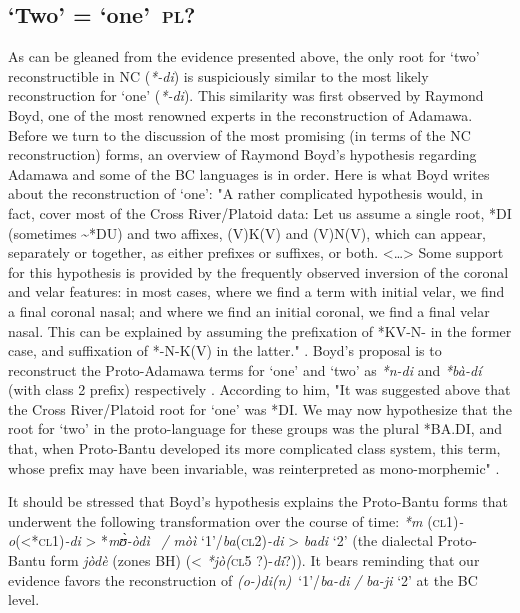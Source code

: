 \subsection{ ‘Two’ = ‘one’~\textsc{pl}?}%
As can be gleaned from the evidence presented above, the only root for ‘two’ reconstructible in NC (\textit{*-di}) is suspiciously similar to the most likely reconstruction for ‘one’ (\textit{*-di}). This similarity was first observed by Raymond Boyd, one of the most renowned experts in the reconstruction of Adamawa. Before we turn to the discussion of the most promising (in terms of the NC reconstruction) forms, an overview of Raymond Boyd’s hypothesis regarding Adamawa and some of the BC languages is in order. Here is what Boyd writes about the reconstruction of ‘one’: "A rather complicated hypothesis would, in fact, cover most of the Cross River/Platoid data: Let us assume a single root, *DI (sometimes {\textasciitilde}*DU) and two affixes, (V)K(V) and (V)N(V), which can appear, separately or together, as either prefixes or suffixes, or both. <…> Some support for this hypothesis is provided by the frequently observed inversion of the coronal and velar features: in most cases, where we find a term with initial velar, we find a final coronal nasal; and where we find an initial coronal, we find a final velar nasal. This can be explained by assuming the prefixation of *KV-N- in the former case, and suffixation of *-N-K(V) in the latter." \citep[151-152]{Boyd1989}. Boyd’s proposal is to reconstruct the Proto-Adamawa terms for ‘one’  and ‘two’ as \textit{*n-di} and \textit{*bà-dí} (with class 2 prefix) respectively \citep[156]{Boyd1989}. According to him, "It was suggested above that the Cross River/Platoid root for ‘one’ was *DI. We may now hypothesize that the root for ‘two’ in the proto-language for these groups was the plural *BA.DI, and that, when Proto-Bantu developed its more complicated class system, this term, whose prefix may have been invariable, was reinterpreted as mono-morphemic" \citep[157]{Boyd1989}. 

It should be stressed that Boyd’s hypothesis explains the Proto-Bantu forms that underwent the following transformation over the course of time: \textit{*m} (\textsc{cl}1)\textit{-o}(<*\textsc{cl}1)\textit{-di} > *\textit{m{\`{ʊ}}-òdì~} \textit{/} \textit{mòì} ‘1’/\textit{ba}(\textsc{cl}2)\textit{-di} > \textit{badi} ‘2’ (the dialectal Proto-Bantu form \textit{jòdè} (zones BH) (< \textit{*jò(}\textsc{cl}5 ?)-\textit{di}?)). It bears reminding that our evidence favors the reconstruction of \textit{(o-)di(n)}~‘1’/\textit{ba-di} \textit{/} \textit{ba-ji} ‘2’ at the BC level. 

